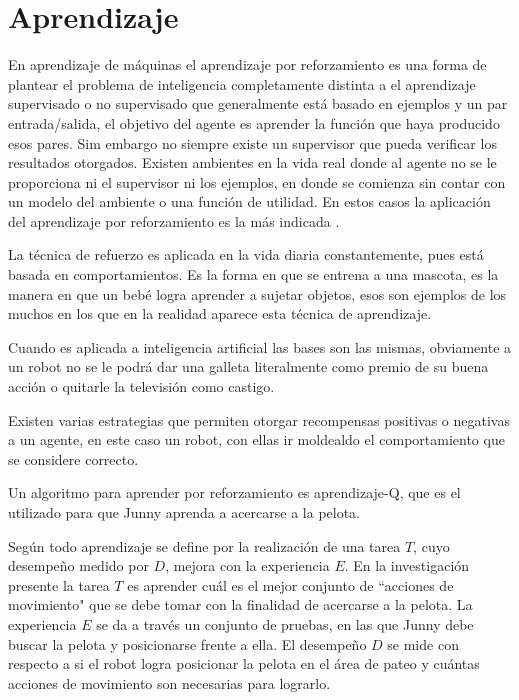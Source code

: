 
\section{Aprendizaje}\label{aprendizaje}

En aprendizaje de m\'aquinas el aprendizaje por reforzamiento es una forma de plantear el problema de inteligencia completamente distinta a el aprendizaje supervisado o no supervisado que generalmente está basado en ejemplos y un par entrada/salida, el objetivo del agente es aprender la funci\'on que haya producido esos pares. Sim embargo no siempre existe un supervisor que pueda verificar los resultados otorgados.
Existen ambientes en la vida real donde al agente no se le proporciona ni el supervisor ni los ejemplos, en donde se comienza sin contar con un modelo del ambiente o una funci\'on de utilidad. En estos casos la aplicaci\'on del aprendizaje por reforzamiento es la más indicada \cite{peterAndNorvig}.

La t\'ecnica de refuerzo es aplicada en la vida diaria constantemente, pues está basada en comportamientos. Es la forma en que se entrena a una mascota, es la manera en que un bebé logra aprender a sujetar objetos, esos son ejemplos de los muchos en los que en la realidad aparece esta t\'ecnica de aprendizaje.

Cuando es aplicada a inteligencia artificial las bases son las mismas, obviamente a un robot no se le podr\'a dar una galleta literalmente como premio de su buena acci\'on o quitarle la televisi\'on como castigo.
 
Existen varias estrategias que permiten otorgar recompensas positivas o negativas a un agente, en este caso un robot, con ellas ir moldealdo el comportamiento que se considere correcto.

Un algoritmo para aprender por reforzamiento es aprendizaje-Q, que es el utilizado para que Junny aprenda a acercarse a la pelota.
 


Según \cite{Mitchell} todo aprendizaje se define por la realización de una tarea $T$, cuyo desempeño medido por $D$, mejora con la experiencia $E$. En la investigación presente la tarea $T$ es aprender cuál es el mejor conjunto de ``acciones de movimiento" que se debe tomar con la finalidad de acercarse a la pelota. La experiencia $E$ se da a través un conjunto de pruebas, en las que Junny debe buscar la pelota y posicionarse frente a ella. El desempeño $D$ se mide con respecto a si el robot logra posicionar la pelota en el área de pateo y cuántas acciones de movimiento son necesarias para lograrlo.

